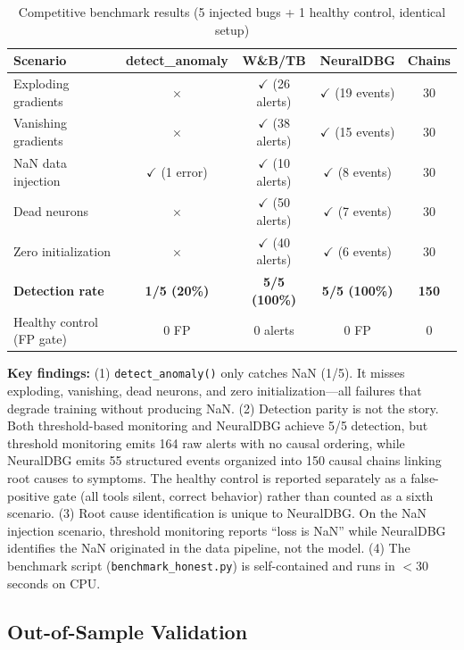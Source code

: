 \documentclass[11pt]{article}
\begin{document}
\begin{table}[h]
\centering
\caption{Competitive benchmark results (5 injected bugs + 1 healthy control, identical setup)}
\begin{tabular}{lcccc}
\toprule
\textbf{Scenario} & \textbf{detect\_anomaly} & \textbf{W\&B/TB} & \textbf{NeuralDBG} & \textbf{Chains} \\
\midrule
Exploding gradients & $\times$ & $\checkmark$ (26 alerts) & $\checkmark$ (19 events) & 30 \\
Vanishing gradients & $\times$ & $\checkmark$ (38 alerts) & $\checkmark$ (15 events) & 30 \\
NaN data injection & $\checkmark$ (1 error) & $\checkmark$ (10 alerts) & $\checkmark$ (8 events) & 30 \\
Dead neurons & $\times$ & $\checkmark$ (50 alerts) & $\checkmark$ (7 events) & 30 \\
Zero initialization & $\times$ & $\checkmark$ (40 alerts) & $\checkmark$ (6 events) & 30 \\
\midrule
\textbf{Detection rate} & \textbf{1/5 (20\%)} & \textbf{5/5 (100\%)} & \textbf{5/5 (100\%)} & \textbf{150} \\
Healthy control (FP gate) & 0 FP & 0 alerts & 0 FP & 0 \\
\bottomrule
\end{tabular}
\end{table}

\textbf{Key findings:} (1) \texttt{detect\_anomaly()} only catches NaN (1/5). It misses exploding, vanishing, dead neurons, and zero initialization---all failures that degrade training without producing NaN. (2) Detection parity is not the story. Both threshold-based monitoring and NeuralDBG achieve 5/5 detection, but threshold monitoring emits 164 raw alerts with no causal ordering, while NeuralDBG emits 55 structured events organized into 150 causal chains linking root causes to symptoms. The healthy control is reported separately as a false-positive gate (all tools silent, correct behavior) rather than counted as a sixth scenario. (3) Root cause identification is unique to NeuralDBG. On the NaN injection scenario, threshold monitoring reports ``loss is NaN'' while NeuralDBG identifies the NaN originated in the data pipeline, not the model. (4) The benchmark script (\texttt{benchmark\_honest.py}) is self-contained and runs in $<$30 seconds on CPU.

\subsection{Out-of-Sample Validation}
\end{document}
